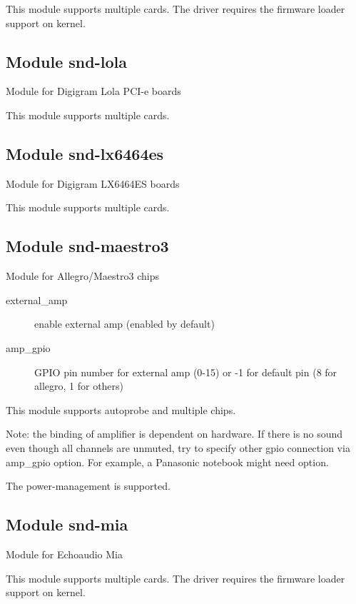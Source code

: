 \documentclass[a4paper,8pt,english]{sphinxmanual}
\begin{document}
This module supports multiple cards.
The driver requires the firmware loader support on kernel.


\subsection{Module snd-lola}
\label{sound/alsa-configuration:module-snd-lola}
Module for Digigram Lola PCI-e boards

This module supports multiple cards.


\subsection{Module snd-lx6464es}
\label{sound/alsa-configuration:module-snd-lx6464es}
Module for Digigram LX6464ES boards

This module supports multiple cards.


\subsection{Module snd-maestro3}
\label{sound/alsa-configuration:module-snd-maestro3}
Module for Allegro/Maestro3 chips
\begin{description}
\item[{external\_amp}] \leavevmode
enable external amp (enabled by default)

\item[{amp\_gpio}] \leavevmode
GPIO pin number for external amp (0-15) or -1 for default pin (8
for allegro, 1 for others)

\end{description}

This module supports autoprobe and multiple chips.

Note: the binding of amplifier is dependent on hardware.
If there is no sound even though all channels are unmuted, try to
specify other gpio connection via amp\_gpio option.
For example, a Panasonic notebook might need 
option.

The power-management is supported.


\subsection{Module snd-mia}
\label{sound/alsa-configuration:module-snd-mia}
Module for Echoaudio Mia

This module supports multiple cards.
The driver requires the firmware loader support on kernel.
\end{document}
